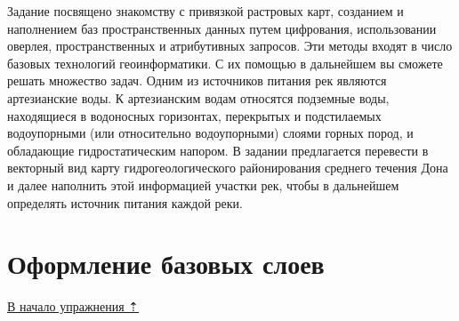 \documentclass[12pt,]{book}
\begin{document}
Задание посвящено знакомству с привязкой растровых карт, созданием и наполнением баз пространственных данных путем цифрования, использовании оверлея, пространственных и атрибутивных запросов. Эти методы входят в число базовых технологий геоинформатики. С их помощью в дальнейшем вы сможете решать множество задач. Одним из источников питания рек являются артезианские воды. К артезианским водам относятся подземные воды, находящиеся в водоносных горизонтах, перекрытых и подстилаемых водоупорными (или относительно водоупорными) слоями горных пород, и обладающие гидростатическим напором. В задании предлагается перевести в векторный вид карту гидрогеологического районирования среднего течения Дона и далее наполнить этой информацией участки рек, чтобы в дальнейшем определять источник питания каждой реки.

\hypertarget{map-ref-hydrogeologic-base}{%
\section{Оформление базовых слоев}\label{map-ref-hydrogeologic-base}}

\protect\hyperlink{map-ref-hydrogeologic}{В начало упражнения ⇡}
\end{document}
